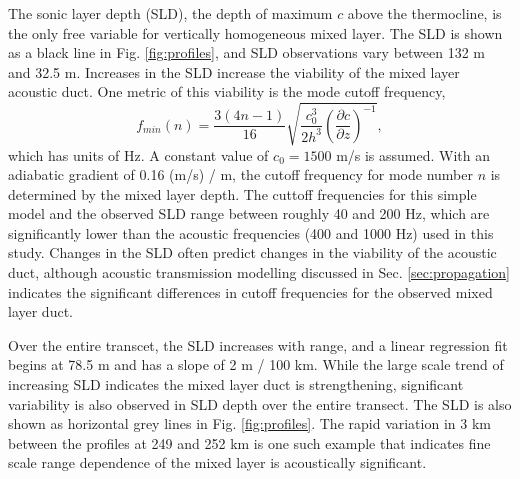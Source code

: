 \documentclass[preprint,NumberedRefs]{JASA}
\begin{document}
The sonic layer depth (SLD), the depth of maximum $c$ above the thermocline, is the only free variable for vertically homogeneous mixed layer. The SLD is shown as a black line in Fig. \ref{fig:profiles}, and SLD observations vary between 132 m and 32.5 m. Increases in the SLD increase the viability of the mixed layer acoustic duct. One metric of this viability is the mode cutoff frequency,
\begin{equation}
    f_{min}(n) = \frac{3(4n-1)}{16} \sqrt{\frac{c_0^3}{2h^3} \left( \frac{\partial c}{\partial z} \right) ^ {-1}},
    \label{eq:f_cutoff}
\end{equation}
which has units of Hz. A constant value of $c_0 = 1500$ m/s is assumed. With an adiabatic gradient of 0.16 (m/s) / m, the cutoff frequency for mode number $n$ is determined by the mixed layer depth. The cuttoff frequencies for this simple model and the observed SLD range between roughly 40 and 200 Hz, which are significantly lower than the acoustic frequencies (400 and 1000 Hz) used in this study. Changes in the SLD often predict changes in the viability of the acoustic duct, although acoustic transmission modelling discussed in Sec. \ref{sec:propagation} indicates the significant differences in cutoff frequencies for the observed mixed layer duct.

Over the entire transcet, the SLD increases with range, and a linear regression fit begins at 78.5 m and has a slope of 2 m / 100 km. While the large scale trend of increasing SLD indicates the mixed layer duct is strengthening, significant variability is also observed in SLD depth over the entire transect. The SLD is also shown as horizontal grey lines in Fig. \ref{fig:profiles}. The rapid variation in 3 km between the profiles at 249 and 252 km is one such example that indicates fine scale range dependence of the mixed layer is acoustically significant.
\end{document}
